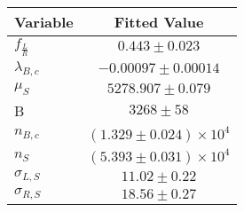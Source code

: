 \begin{tabular}[t]{lc}
\hline
Variable &Fitted Value\\
\hline\hline
$f_{\frac{L}{R}}$&$0.443\pm0.023$\\
\hline
$\lambda_{B,c}$&$-0.00097\pm0.00014$\\
\hline
$\mu_S$&$5278.907\pm0.079$\\
\hline
B&$3268\pm58$\\
\hline
$n_{B,c}$&$(1.329\pm0.024)\times 10^4$\\
\hline
$n_S$&$(5.393\pm0.031)\times 10^4$\\
\hline
$\sigma_{L, S}$&$11.02\pm0.22$\\
\hline
$\sigma_{R, S}$&$18.56\pm0.27$\\
\hline
\end{tabular}